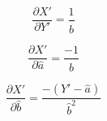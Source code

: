 \documentclass[12pt]{article}
\begin{document}
\pagestyle{empty}
\Large
{}
\pagecolor{ehandbook}

\[
\frac{\partial{X'}}{\partial{Y'}} = \frac{1}{\hat{b}}
\]

\[
\frac{\partial{X'}}{\partial{\hat{a}}} = \frac{-1}{\hat{b}}
\]


\[
\frac{\partial{X'}}{\partial{\hat{b}}} = \frac{-(Y'-\hat{a})}{\hat{b}^{2}}
\]
\end{document}
